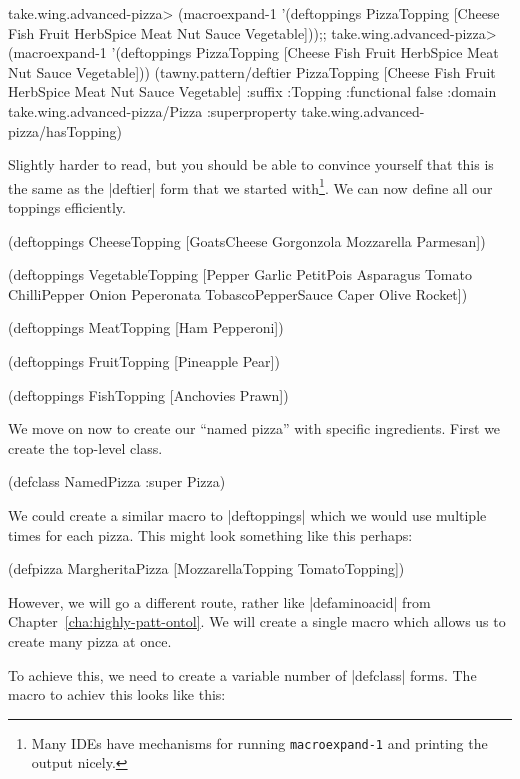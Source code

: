 \begin{tawnyexample}
take.wing.advanced-pizza> (macroexpand-1 '(deftoppings PizzaTopping [Cheese Fish Fruit HerbSpice Meat Nut Sauce Vegetable]));; take.wing.advanced-pizza> (macroexpand-1 '(deftoppings PizzaTopping [Cheese Fish Fruit HerbSpice Meat Nut Sauce Vegetable]))
(tawny.pattern/deftier PizzaTopping [Cheese Fish Fruit HerbSpice Meat Nut Sauce Vegetable] :suffix :Topping :functional false :domain take.wing.advanced-pizza/Pizza :superproperty take.wing.advanced-pizza/hasTopping)
\end{tawnyexample}

Slightly harder to read, but you should be able to convince yourself
that this is the same as the |deftier| form that we started
with\footnote{Many IDEs have mechanisms for running \lstinline{macroexpand-1}
  and printing the output nicely.}. We can now define all our toppings
efficiently.

\begin{tawny}
(deftoppings CheeseTopping
  [GoatsCheese Gorgonzola Mozzarella Parmesan])

(deftoppings VegetableTopping
  [Pepper Garlic PetitPois Asparagus Tomato ChilliPepper Onion
   Peperonata TobascoPepperSauce Caper Olive Rocket])

(deftoppings MeatTopping
  [Ham Pepperoni])

(deftoppings FruitTopping
  [Pineapple Pear])

(deftoppings FishTopping
  [Anchovies Prawn])
\end{tawny}

We move on now to create our ``named pizza'' with specific
ingredients. First we create the top-level class.

\begin{tawny}
(defclass NamedPizza
  :super Pizza)
\end{tawny}

We could create a similar macro to |deftoppings| which we would use
multiple times for each pizza. This might look something like this
perhaps:

\begin{tawnyexample}
(defpizza MargheritaPizza [MozzarellaTopping TomatoTopping])
\end{tawnyexample}

However, we will go a different route, rather like |defaminoacid| from
Chapter~\ref{cha:highly-patt-ontol}. We will create a single macro
which allows us to create many pizza at once.

To achieve this, we need to create a variable number of |defclass|
forms. The macro to achiev this looks like this:

